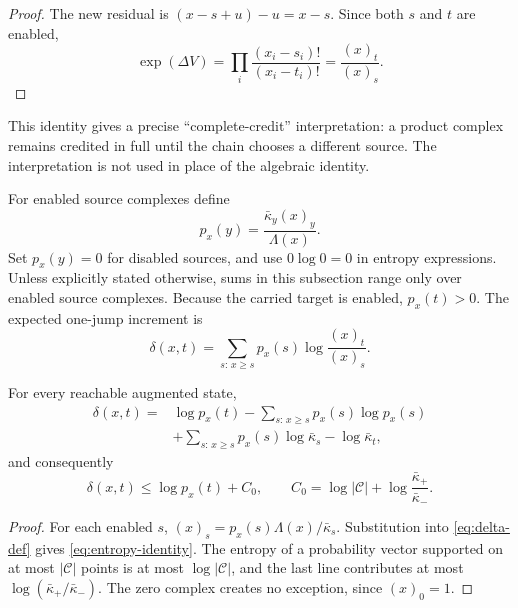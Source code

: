 \begin{proof}
The new residual is \((x-s+u)-u=x-s\).  Since both \(s\) and \(t\) are
enabled,
\[
 \exp(\Delta V)
 =\prod_i\frac{(x_i-s_i)!}{(x_i-t_i)!}
 =\frac{(x)_t}{(x)_s}.
\]
\end{proof}

This identity gives a precise ``complete-credit'' interpretation: a product
complex remains credited in full until the chain chooses a different source.
The interpretation is not used in place of the algebraic identity.

For enabled source complexes define
\begin{equation}\label{eq:source-prob}
  p_x(y)=\frac{\bar\kappa_y(x)_y}{\Lambda(x)}.
\end{equation}
Set \(p_x(y)=0\) for disabled sources, and use \(0\log0=0\) in entropy
expressions.  Unless explicitly stated otherwise, sums in this subsection
range only over enabled source complexes.  Because the carried target is
enabled, \(p_x(t)>0\).  The expected one-jump increment is
\begin{equation}\label{eq:delta-def}
  \delta(x,t)=\sum_{s:\,x\ge s}p_x(s)
  \log\frac{(x)_t}{(x)_s}.
\end{equation}

\begin{lemma}\label{lem:entropy}
For every reachable augmented state,
\begin{equation}\label{eq:entropy-identity}
\begin{split}
  \delta(x,t)
  ={}&\log p_x(t)-\sum_{s:\,x\ge s} p_x(s)\log p_x(s)\\
    &+\sum_{s:\,x\ge s} p_x(s)\log\bar\kappa_s
      -\log\bar\kappa_t,
\end{split}
\end{equation}
and consequently
\begin{equation}\label{eq:entropy-bound}
  \delta(x,t)\le\log p_x(t)+C_0,
  \qquad
  C_0=\log|\mathcal C|+
  \log\frac{\bar\kappa_+}{\bar\kappa_-}.
\end{equation}
\end{lemma}

\begin{proof}
For each enabled \(s\),
\((x)_s=p_x(s)\Lambda(x)/\bar\kappa_s\).  Substitution into
\eqref{eq:delta-def} gives \eqref{eq:entropy-identity}.  The entropy of a
probability vector supported on at most \(|\mathcal C|\) points is at most
\(\log|\mathcal C|\), and the last line contributes at most
\(\log(\bar\kappa_+/\bar\kappa_-)\).  The zero complex creates no exception,
since \((x)_0=1\).
\end{proof}

